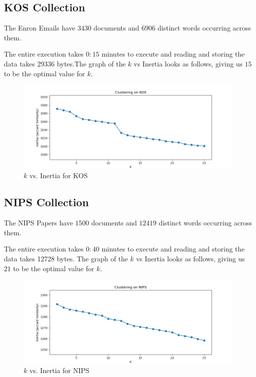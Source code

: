 \documentclass[10pt]{article}
\begin{document}
    \subsection{KOS Collection}
        The Enron Emails have $3430$ documents and $6906$ distinct words occurring across them.

        The entire execution takes $0:15$ minutes to execute and reading and storing the data takes 29336 bytes.The graph of the $k$ vs Inertia looks as follows, giving us $15$ to be the optimal value for $k$.
        \begin{figure}[h]
            \centering
            \includegraphics[width=12cm]{KOS.png}
            \caption{$k$ vs. Inertia for KOS}
            \label{fig:KOS-Inertia}
        \end{figure}

    \subsection{NIPS Collection}
        The NIPS Papers have $1500$ documents and $12419$ distinct words occurring across them.

        The entire execution takes $0:40$ minutes to execute and reading and storing the data takes 12728 bytes.
        The graph of the $k$ vs Inertia looks as follows, giving us $21$ to be the optimal value for $k$.
        \begin{figure}[h]
            \centering
            \includegraphics[width=12cm]{NIPS.png}
            \caption{$k$ vs. Inertia for NIPS}
            \label{fig:NIPS-Inertia}
        \end{figure}
\end{document}

